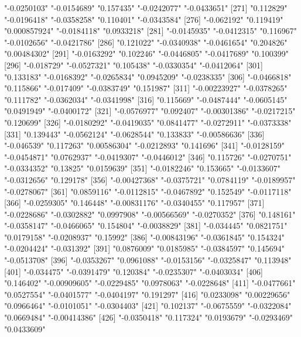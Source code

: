 \begin{Schunk}
\begin{Soutput}
[266] "-0.0250103"   "-0.0154689"   "0.157435"     "-0.0242077"   "-0.0433651"  
[271] "0.112829"     "-0.0196418"   "-0.0358258"   "0.110401"     "-0.0343584"  
[276] "-0.062192"    "0.119419"     "0.000857924"  "-0.0184118"   "0.0933218"   
[281] "-0.0145935"   "-0.0412315"   "0.116967"     "-0.0102656"   "-0.0421786"  
[286] "0.121022"     "-0.0340938"   "-0.0461654"   "0.204826"     "0.00484302"  
[291] "-0.0163292"   "0.102246"     "-0.0446805"   "-0.0417689"   "0.100399"    
[296] "-0.018729"    "-0.0527321"   "0.105438"     "-0.0330354"   "-0.0412064"  
[301] "0.133183"     "-0.0168392"   "-0.0265834"   "0.0945209"    "-0.0238335"  
[306] "-0.0466818"   "0.115866"     "-0.017409"    "-0.0383749"   "0.151987"    
[311] "-0.00223927"  "-0.0378265"   "0.111782"     "-0.0362034"   "-0.0341998"  
[316] "0.115669"     "-0.0487444"   "-0.0605145"   "0.0491949"    "-0.0400172"  
[321] "-0.0576977"   "0.092407"     "-0.00301386"  "-0.0217215"   "0.120699"    
[326] "-0.0180292"   "-0.0419035"   "0.0841477"    "-0.0272911"   "-0.0373338"  
[331] "0.139443"     "-0.0562124"   "-0.0628544"   "0.133833"     "-0.00586636" 
[336] "-0.046539"    "0.117263"     "0.00586304"   "-0.0212893"   "0.141696"    
[341] "-0.0128159"   "-0.0454871"   "0.0762937"    "-0.0419307"   "-0.0446012"  
[346] "0.115726"     "-0.0270751"   "-0.0334352"   "0.13825"      "0.0159639"   
[351] "-0.0182246"   "0.153665"     "-0.0133607"   "-0.0312656"   "0.129178"    
[356] "-0.00427368"  "-0.0375721"   "0.0784119"    "-0.0189957"   "-0.0278067"  
[361] "0.0859116"    "-0.0112815"   "-0.0467892"   "0.152549"     "-0.0117118"  
[366] "-0.0259305"   "0.146448"     "-0.00831176"  "-0.0340455"   "0.117957"    
[371] "-0.0228686"   "-0.0302882"   "0.0997908"    "-0.00566569"  "-0.0270352"  
[376] "0.148161"     "-0.0358147"   "-0.0466065"   "0.154804"     "-0.0038829"  
[381] "-0.034445"    "0.0821751"    "0.0179158"    "-0.0208937"   "0.15992"     
[386] "-0.00843196"  "-0.0361845"   "0.154324"     "-0.0204424"   "-0.031392"   
[391] "0.0876009"    "0.0185985"    "-0.0384597"   "0.145694"     "-0.0513708"  
[396] "-0.0353267"   "0.0961088"    "-0.0153156"   "-0.0325847"   "0.113948"    
[401] "-0.034475"    "-0.0391479"   "0.120384"     "-0.0235307"   "-0.0403034"  
[406] "0.146402"     "-0.00909605"  "-0.0229485"   "0.0978063"    "-0.0228648"  
[411] "-0.0477661"   "0.0527554"    "-0.0401577"   "-0.0404197"   "0.191297"    
[416] "0.0233098"    "0.00229656"   "0.0966464"    "-0.0101051"   "-0.0304403"  
[421] "0.102137"     "-0.0675559"   "-0.0322084"   "0.0669484"    "-0.00414386" 
[426] "-0.0350418"   "0.117324"     "0.0193679"    "-0.0293469"   "0.0433609"   

\end{Soutput}
\end{Schunk}
